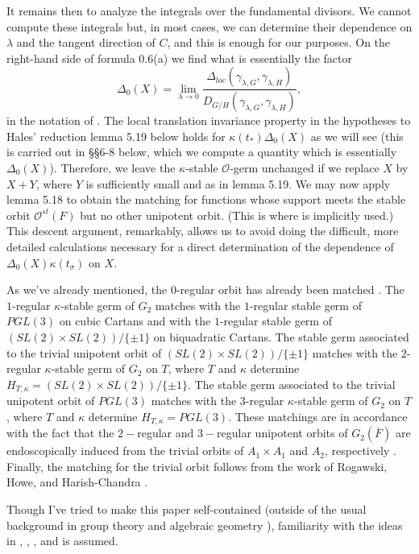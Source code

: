 \documentclass[12pt,letterpaper]{amsart}
\begin{document}
It remains then to analyze the integrals
over the fundamental divisors. We cannot compute these integrals
but, in most cases, we can determine their dependence on $\lambda$
and the tangent direction of $C$, and this is enough for our purposes.
On the right-hand side of
formula 0.6(a) we find what is essentially the factor
\[
\Delta_{0}(X)=\lim_{\lambda\rightarrow 0}
\frac{{\Delta_{loc}(\gamma_{\lambda,G},\gamma_{\lambda,H})}}{D_{G/H}(\gamma_{\lambda,G},\gamma_{\lambda,H})},
\]
in the notation of \cite[\S 2]{Ha92b}.
The local translation invariance property in the hypotheses to
Hales' reduction lemma 5.19 below holds for
$\kappa(t_*)\Delta_0(X)$ as we will see (this is carried out in \S\S6-8
below, which we compute a quantity which is essentially
$\Delta_0(X)$).
Therefore, we leave the $\kappa$-stable ${\mathcal O}$-germ
unchanged if we replace $X$ by $X+Y$, where $Y$ is sufficiently small
and as in lemma 5.19.
We may now apply lemma 5.18 to obtain the matching for functions
whose support meets the stable orbit ${\mathcal O}^{st}(F)$ but no
other unipotent orbit.
(This is where \cite{LS90} is implicitly used.)
This descent argument, remarkably, allows us to
avoid doing the difficult, more detailed calculations necessary for a
direct determination of the dependence of
$\Delta_{0}(X)\kappa(t_\sigma)$ on $X$.

As we've already mentioned, the $0$-regular orbit has already been matched
\cite{She89}.
The $1$-regular $\kappa$-stable germ of $G_2$ matches with the
$1$-regular stable germ of $PGL(3)$ on cubic Cartans and with the
$1$-regular stable germ of $(SL(2)\times SL(2))/\{\pm 1\}$
on biquadratic Cartans.
The stable germ associated to the
trivial unipotent orbit of $(SL(2)\times SL(2))/\{\pm 1\}$
matches with the 2-regular $\kappa$-stable
germ of $G_2$ on $T$, where $T$ and $\kappa$ determine
$H_{T,\kappa}=(SL(2)\times SL(2))/\{\pm 1\}$. The stable germ associated to the
trivial unipotent orbit of $PGL(3)$ matches with the 3-regular $\kappa$-stable
germ of $G_2$ on $T$, where $T$ and $\kappa$ determine $H_{T,\kappa}=PGL(3)$.
These matchings are in accordance with the fact that the $2-$regular
and $3-$regular unipotent orbits of $G_2(\overline{F})$
are endoscopically induced from the trivial orbits of $A_1\times A_1$
and $A_2$, respectively \cite[ch. III, table on page 221]{Spa82}.
Finally, the matching for the  trivial orbit follows from the work
of Rogawski, Howe, and Harish-Chandra \cite{Ro80}.

Though I've tried to make this paper self-contained (outside of
the usual background in group theory \cite{Bor91} and
algebraic geometry \cite{Mu88}), familiarity
with the ideas in \cite{La83}, \cite{LS89}, \cite{Ha92a}, and \cite{Ha92b} is assumed.
\end{document}
